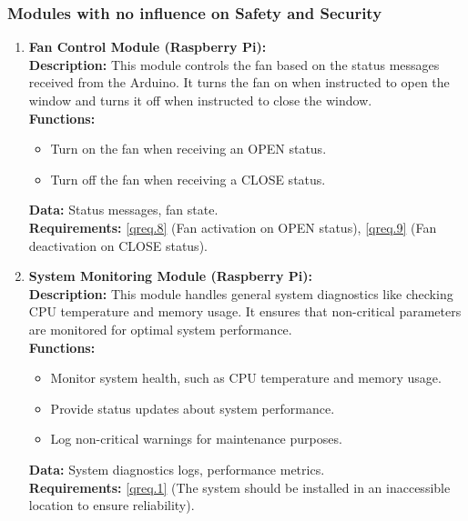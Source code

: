 \subsubsection{Modules with no influence on Safety and Security}
\begin{enumerate}
    \item \textbf{Fan Control Module (Raspberry Pi):} \\ 
        \textbf{Description:} This module controls the fan based on the status messages received from the Arduino. It turns the fan on when instructed to open the window and turns it off when instructed to close the window. \\ 
        \textbf{Functions:}
        \begin{itemize}
            \item Turn on the fan when receiving an OPEN status.
            \item Turn off the fan when receiving a CLOSE status.
        \end{itemize}
        \textbf{Data:} Status messages, fan state. \\ 
        \textbf{Requirements:} \ref{qreq.8} (Fan activation on OPEN status), \ref{qreq.9} (Fan deactivation on CLOSE status).

    \item \textbf{System Monitoring Module (Raspberry Pi):} \\ 
        \textbf{Description:} This module handles general system diagnostics like checking CPU temperature and memory usage. It ensures that non-critical parameters are monitored for optimal system performance. \\ 
        \textbf{Functions:}
        \begin{itemize}
            \item Monitor system health, such as CPU temperature and memory usage.
            \item Provide status updates about system performance.
            \item Log non-critical warnings for maintenance purposes.
        \end{itemize}
        \textbf{Data:} System diagnostics logs, performance metrics. \\ 
        \textbf{Requirements:} \ref{qreq.1} (The system should be installed in an inaccessible location to ensure reliability).
\end{enumerate}

